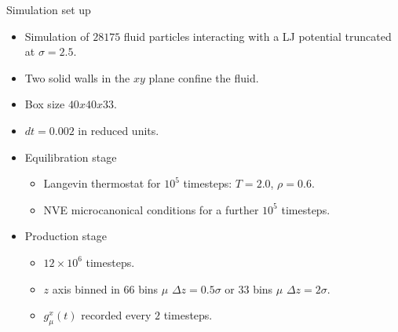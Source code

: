 \documentclass{beamer}
\begin{document}
\begin{frame}{Simulation set up}
   \begin{itemize}
     \item Simulation of $28175$ fluid particles interacting with a \alert{LJ potential} truncated at $\sigma=2.5$.
     \item Two solid walls in the $xy$ plane confine the fluid.  
     \item Box size $40x40x33$. 
     \item $dt=0.002$ in reduced units.
     \item \alert{Equilibration stage}
       \begin{itemize}
         \item Langevin thermostat for $10^5$ timesteps: $T=2.0$, $\rho=0.6$.
         \item NVE microcanonical conditions for a further $10^5$ timesteps.
          \end{itemize}
        \item \alert{Production stage}
       \begin{itemize}
         \item $12\times10^6$ timesteps.
         \item $z$ axis binned in $66$ bins $\mu$ \alert{$\Delta z=0.5\sigma$} or $33$ bins $\mu$ \alert{$\Delta z=2\sigma$}.
         \item $g_{\mu}^x(t)$ recorded every $2$ timesteps. 
         \end{itemize}
     \end{itemize}
\end{frame}
\end{document}
